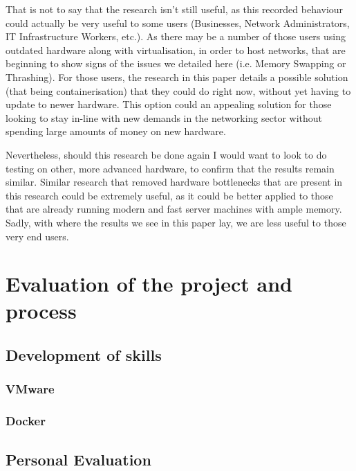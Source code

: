 That is not to say that the research isn't still useful, as this recorded behaviour could actually be very useful to some users (Businesses, Network Administrators, IT Infrastructure Workers, etc.). As there may be a number of those users using outdated hardware along with virtualisation, in order to host networks, that are beginning to show signs of the issues we detailed here (i.e. Memory Swapping or Thrashing). For those users, the research in this paper details a possible solution (that being containerisation) that they could do right now, without yet having to update to newer hardware. This option could an appealing solution for those looking to stay in-line with new demands in the networking sector without spending large amounts of money on new hardware.

Nevertheless, should this research be done again I would want to look to do testing on other, more advanced hardware, to confirm that the results remain similar. Similar research that removed hardware bottlenecks that are present in this research could be extremely useful, as it could be better applied to those that are already running modern and fast server machines with ample memory. Sadly, with where the results we see in this paper lay, we are less useful to those very end users.



\chapter{Evaluation of the project and process}%

\section{Development of skills}
\subsection{VMware}%

\subsection{Docker}%

\section{Personal Evaluation}%

